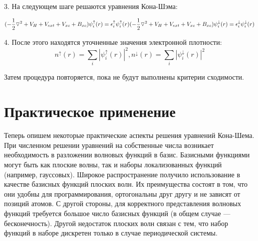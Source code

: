 3.	На следующем шаге решаются уравнения Кона-Шэма:


\[
 (-\frac{1}{2}\triangledown^2+V_H+V_{ext}+V_{xc}+B_{xc})\psi_i^\uparrow(r)=\epsilon_i^\uparrow\psi_i^\uparrow(r) \\
(-\frac{1}{2}\triangledown^2+V_H+V_{ext}+V_{xc}+B_{xc})\psi_i^\downarrow(r)=\epsilon_i^\downarrow\psi_i^\downarrow(r)
 \]



4.	После этого находятся уточненные значения электронной плотности:
\[
n^\uparrow(r)=\sum_i|\psi^\uparrow_i(r)|^2, n^\downarrow(r)=\sum_i|\psi^\downarrow_i(r)|^2
\]
    
    Затем процедура повторяется, пока не будут выполнены критерии сходимости.
    
\section{Практическое применение}
	
	Теперь опишем некоторые практические аспекты решения уравнений Кона-Шема. При численном решении уравнений на собственные числа возникает необходимость в разложении волновых функций в базис. Базисными функциями могут быть как плоские волны, так и наборы локализованных функций (например, гауссовых). Широкое распространение получило использование в качестве базисных функций плоских волн. Их преимущества состоят в том, что они удобны для программирования, ортогональны друг другу и не зависят от позиций атомов. С другой стороны, для корректного представления волновых функций требуется большое число базисных функций (в общем случае — бесконечность). Другой недостаток плоских волн связан с тем, что набор функций в наборе дискретен только в случае периодической системы.
	
